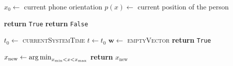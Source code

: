\begin{algorithm}
    \caption{\singletag}\label{alg:batphone}
    \begin{algorithmic}[1] 
        \State $x_0 \gets $ current phone orientation 
        \State $p(x) \gets $ current position of the person

                    \textbf{return} \texttt{True}
                \EndIf
            \State \textbf{return} \texttt{False}
        \EndProcedure

            \State $t_0 \gets $ \textsc{currentSystemTime} 
            \State $t \gets t_0$
            \State $\mathbf{w} \gets $ \textsc{emptyVector}
            \State \textbf{return} \texttt{True}
        \EndProcedure

            \State $x_\mathrm{new} \gets \operatorname*{arg\,min}_{x_\mathrm{min} < x <
                x_\mathrm{max}} $ 
            \State \textbf{return} $x_\mathrm{new}$
        \EndProcedure

%
%
    \end{algorithmic}
\end{algorithm}